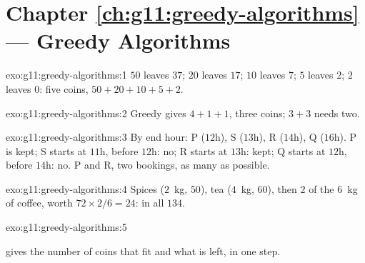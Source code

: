 \section*{Chapter \ref{ch:g11:greedy-algorithms} --- Greedy Algorithms}

\begin{solution}{exo:g11:greedy-algorithms:1}
$50$ leaves $37$; $20$ leaves $17$; $10$ leaves $7$; $5$ leaves $2$; $2$ leaves $0$: five coins, $50 + 20 + 10 + 5 + 2$.
\end{solution}

\begin{solution}{exo:g11:greedy-algorithms:2}
Greedy gives $4 + 1 + 1$, three coins; $3 + 3$ needs two.
\end{solution}

\begin{solution}{exo:g11:greedy-algorithms:3}
By end hour: P ($12$h), S ($13$h), R ($14$h), Q ($16$h). P is kept; S starts at $11$h, before $12$h: no; R starts at
$13$h: kept; Q starts at $12$h, before $14$h: no. P and R, two bookings, as many as possible.
\end{solution}

\begin{solution}{exo:g11:greedy-algorithms:4}
Spices ($2$~kg, $50$), tea ($4$~kg, $60$), then $2$ of the $6$~kg of coffee, worth $72 \times 2/6 = 24$: in all
$134$.
\end{solution}

\begin{solution}{exo:g11:greedy-algorithms:5}
\smallskip\noindent\hspace*{2em}

\noindent\hspace*{4em}

\noindent\hspace*{4em}

\noindent\hspace*{6em}

\noindent\hspace*{6em}

\noindent\hspace*{4em}

\smallskip\noindent {} gives the number of coins  that fit and what is left, in one step.
\end{solution}

